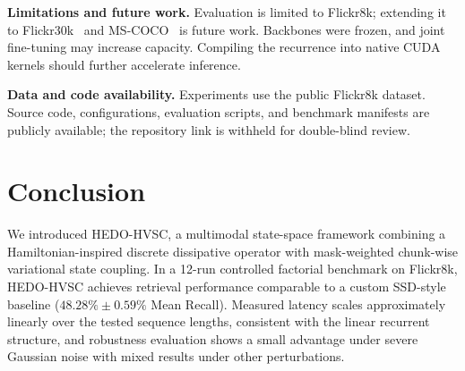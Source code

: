 \documentclass[runningheads,a4paper]{llncs}
\begin{document}
\textbf{Limitations and future work.} Evaluation is limited to Flickr8k; extending it to Flickr30k~\cite{young2014image} and MS-COCO~\cite{lin2014microsoft} is future work. Backbones were frozen, and joint fine-tuning may increase capacity. Compiling the recurrence into native CUDA kernels should further accelerate inference.

\textbf{Data and code availability.} Experiments use the public Flickr8k dataset. Source code, configurations, evaluation scripts, and benchmark manifests are publicly available; the repository link is withheld for double-blind review.

\section{Conclusion}
\label{sec:conclusion}
We introduced HEDO-HVSC, a multimodal state-space framework combining a Hamiltonian-inspired discrete dissipative operator with mask-weighted chunk-wise variational state coupling. In a 12-run controlled factorial benchmark on Flickr8k, HEDO-HVSC achieves retrieval performance comparable to a custom SSD-style baseline ($48.28\% \pm 0.59\%$ Mean Recall). Measured latency scales approximately linearly over the tested sequence lengths, consistent with the linear recurrent structure, and robustness evaluation shows a small advantage under severe Gaussian noise with mixed results under other perturbations.



\end{document}

